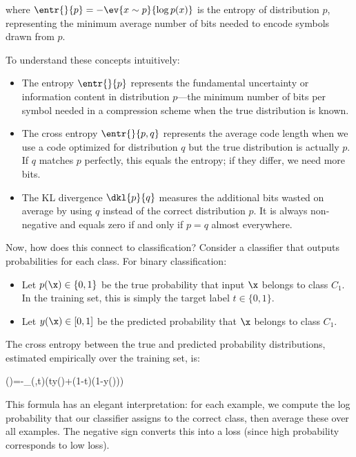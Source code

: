 where $\entr{}{p}=-\ev{x\sim p}{\log p(x)}$ is the \alert{entropy} of distribution $p$, representing the minimum average number of bits needed to encode symbols drawn from $p$.

To understand these concepts intuitively:
\begin{itemize} 
\item The entropy $\entr{}{p}$ represents the fundamental uncertainty or information content in distribution $p$—the minimum number of bits per symbol needed in a compression scheme when the true distribution is known.

\item The cross entropy $\entr{}{p,q}$ represents the average code length when we use a code optimized for distribution $q$ but the true distribution is actually $p$. If $q$ matches $p$ perfectly, this equals the entropy; if they differ, we need more bits.

\item The KL divergence $\dkl{p}{q}$ measures the additional bits wasted on average by using $q$ instead of the correct distribution $p$. It is always non-negative and equals zero if and only if $p = q$ almost everywhere.
\end{itemize}

\medskip

Now, how does this connect to classification? Consider a classifier that outputs probabilities for each class. For binary classification:
\begin{itemize}
\item Let $p(\x) \in \{0,1\}$ be the true probability that input $\x$ belongs to class $C_1$. In the training set, this is simply the target label $t \in \{0,1\}$.
\item Let $y(\x) \in [0,1]$ be the predicted probability that $\x$ belongs to class $C_1$.
\end{itemize}

The cross entropy between the true and predicted probability distributions, estimated empirically over the training set, is:
\begin{myequation}
()=-\sum_{(\x,t)\in{}}\Big(t\log y(\x)+(1-t)\log (1-y(\x))\Big)
\end{myequation}

This formula has an elegant interpretation: for each example, we compute the log probability that our classifier assigns to the correct class, then average these over all examples. The negative sign converts this into a loss (since high probability corresponds to low loss).

